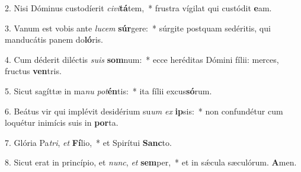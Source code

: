 2. Nisi Dóminus custodíerit \textit{ci}\textit{vi}\textbf{tá}tem,~*  frustra vígilat qui custódit \textbf{e}am.\

3. Vanum est vobis ante \textit{lu}\textit{cem} \textbf{súr}gere:~*  súrgite postquam sedéritis, qui manducátis panem do\textbf{ló}ris.\

4. Cum déderit diléctis \textit{su}\textit{is} \textbf{som}num:~*  ecce heréditas Dómini fílii: merces, fructus \textbf{ven}tris.\

5. Sicut sagíttæ in ma\textit{nu} \textit{pot}\textbf{én}tis:~*  ita fílii excus\textbf{só}rum.\

6. Beátus vir qui implévit desidérium su\textit{um} \textit{ex} \textbf{ip}sis:~*  non confundétur cum loquétur inimícis suis in \textbf{por}ta.\

7. Glória Pa\textit{tri}, \textit{et} \textbf{Fí}lio,~*  et Spirítui \textbf{Sanc}to.\

8. Sicut erat in princípio, et \textit{nunc}, \textit{et} \textbf{sem}per,~*  et in sǽcula sæculórum. \textbf{A}men.\

